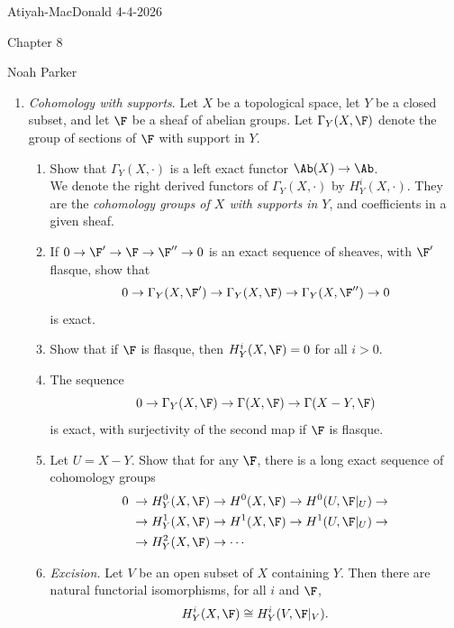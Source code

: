 \documentclass[12pt]{amsart}
\begin{document}
{Atiyah-MacDonald} \hfill {4-4-2026}

\bigskip\bigskip

\begin{center}

{\sc Chapter 8}

\end{center}

\begin{center}

  {Noah Parker} %
    
\end{center}

\bigskip

\begin{enumerate}
  \item[8.3.] {
      \emph{Cohomology with supports}.
      Let $X$ be a topological space, let $Y$ be a closed subset, and let $\F$ be a sheaf of abelian groups.
      Let $\Gamma_Y(X,\F)$ denote the group of sections  of $\F$ with support in $Y$.
      \begin{enumerate}
        \item Show that $\Gamma_Y(X,\cdot)$ is a left exact functor $\Ab(X)\to \Ab$.
          \\ We denote the right derived functors of $\Gamma_Y(X,\cdot)$ by $H_Y^i(X,\cdot)$.
          They are the \emph{cohomology groups of $X$ with supports in $Y$}, and coefficients in a given sheaf.
        \item If $0\to \F'\to\F\to\F''\to 0$ is an exact sequence of sheaves, with $\F'$ flasque, show that
          \[
            0\to \Gamma_Y(X,\F')\to \Gamma_Y(X,\F)\to \Gamma_Y(X,\F'')\to 0
          \] 
          is exact.
        \item Show that if $\F$ is flasque, then $H_Y^i(X,\F)=0$ for all $i>0$.
        \item The sequence
          \[
            0\to \Gamma_Y(X,\F)\to \Gamma(X,\F)\to \Gamma(X-Y,\F)
          \] 
          is exact, with surjectivity of the second map if $\F$ is flasque.
        \item Let $U=X-Y$.
          Show that for any $\F$, there is a long exact sequence of cohomology groups
          \begin{align*}
            0\; &\to H_Y^0(X,\F)\to H^0(X,\F)\to H^0(U,\F|_U)\to \\
                &\to H_Y^1(X,\F)\to H^1(X,\F)\to H^1(U,\F|_U)\to  \\
                &\to H_Y^2(X,\F)\to \cdots
          \end{align*}
        \item \emph{Excision.} Let $V$ be an open subset of $X$ containing $Y$.
          Then there are natural functorial isomorphisms, for all $i$ and $\F$,
          \[
            H_Y^i(X,\F)\cong H_Y^i(V,\F|_V).
          \] 
      \end{enumerate}
    }
\end{enumerate}
\end{document}

